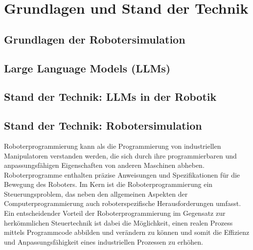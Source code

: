 \chapter{Grundlagen und Stand der Technik} \label{cap:Grundlagen}

\section{Grundlagen der Robotersimulation}
\label{sec:Grundlagen_Robotersimulation}

\section{Large Language Models (LLMs)} \label{sec:Grundlagen_LLMs}
\section{Stand der Technik: LLMs in der Robotik} \label{sec:Stand_LLMs_Robotik}
\section{Stand der Technik: Robotersimulation}
\label{sec:Stand_Robotersimulation} Roboterprogrammierung kann als die
Programmierung von industriellen Manipulatoren verstanden werden, die sich durch
ihre programmierbaren und anpassungsfähigen Eigenschaften von anderen Maschinen
abheben. Roboterprogramme enthalten präzise Anweisungen und Spezifikationen für
die Bewegung des Roboters. Im Kern ist die Roboterprogrammierung ein
Steuerungsproblem, das neben den allgemeinen Aspekten der Computerprogrammierung
auch roboterspezifische Herausforderungen umfasst. 
Ein entscheidender Vorteil der Roboterprogrammierung im Gegensatz zur
herkömmlichen Steuertechnik ist dabei die Möglichkeit, einen realen Prozess
mittels Programmcode abbilden und verändern zu können und somit die Effizienz
und Anpassungsfähigkeit eines industriellen Prozessen zu erhöhen.


